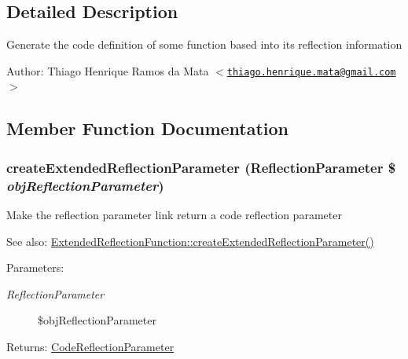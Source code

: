 \subsection{Detailed Description}
Generate the code definition of some function based into its reflection information

\begin{Desc}
\item[Author:]Thiago Henrique Ramos da Mata $<$\href{mailto:thiago.henrique.mata@gmail.com}{\tt thiago.henrique.mata@gmail.com}$>$ \end{Desc}


\subsection{Member Function Documentation}
\hypertarget{class_code_reflection_function_98ceb248f2b535a3a83ac2e7990e0c1f}{
\subsubsection[{createExtendedReflectionParameter}]{\setlength{\rightskip}{0pt plus 5cm}createExtendedReflectionParameter (ReflectionParameter \$ {\em objReflectionParameter})}}
\label{class_code_reflection_function_98ceb248f2b535a3a83ac2e7990e0c1f}


Make the reflection parameter link return a code reflection parameter

\begin{Desc}
\item[See also:]\hyperlink{class_extended_reflection_function_98ceb248f2b535a3a83ac2e7990e0c1f}{ExtendedReflectionFunction::createExtendedReflectionParameter()} \end{Desc}
\begin{Desc}
\item[Parameters:]
\begin{description}
\item[{\em ReflectionParameter}]\$objReflectionParameter \end{description}
\end{Desc}
\begin{Desc}
\item[Returns:]\hyperlink{class_code_reflection_parameter}{CodeReflectionParameter} \end{Desc}


